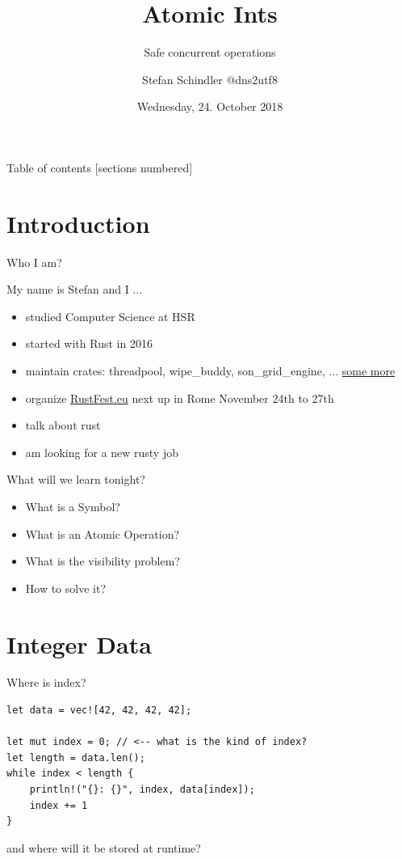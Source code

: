 \documentclass[10pt]{beamer}
\title{Atomic Ints}
\subtitle{Safe concurrent operations}
\date{Wednesday, 24. October 2018}
\author{Stefan Schindler @dns2utf8}
\institute{\href{https://www.meetup.com/de-DE/Rust-Zurich/}{Rust Zürichsee Meetup} hosted by \href{https://coredump.ch}{coredump.ch}}
\begin{document}
\maketitle

\begin{frame}{Table of contents}
  [sections numbered]
  \tableofcontents[hideallsubsections]
\end{frame}

\section{Introduction}

\begin{frame}[fragile]{Who I am?}

My name is Stefan and I ...

\begin{itemize}
\item studied Computer Science at HSR
\item started with Rust in 2016
\item maintain crates: threadpool, wipe\_buddy, son\_grid\_engine, ... \href{https://crates.io/users/dns2utf8}{some more}
\item organize \href{https://rustfest.eu}{RustFest.eu} next up in Rome November 24th to 27th
\item talk about rust
\item am looking for a new rusty job
\end{itemize}

\end{frame}
\begin{frame}{What will we learn tonight?}
  
\begin{itemize}
\item What is a Symbol?
\item What is an Atomic Operation?
\item What is the visibility problem?
\item How to solve it?
\end{itemize}
\end{frame}

\section{Integer Data}

\begin{frame}[fragile]{Where is index?}

\begin{verbatim}
let data = vec![42, 42, 42, 42];

let mut index = 0; // <-- what is the kind of index?
let length = data.len();
while index < length {
    println!("{}: {}", index, data[index]);
    index += 1
}
\end{verbatim}
and \alert{where} will it be stored at runtime?
\end{frame}
\end{document}
